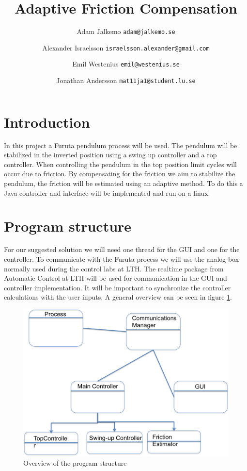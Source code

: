 \documentclass[10pt,a4paper]{article}
\author{Adam Jalkemo \texttt{adam@jalkemo.se} \and
Alexander Israelsson \texttt{israelsson.alexander@gmail.com} \and
Emil Westenius \texttt{emil@westenius.se} \and
Jonathan Andersson \texttt{mat11ja1@student.lu.se}}
\title{Adaptive Friction Compensation}
\begin{document}
\maketitle

\section{Introduction}
In this project a Furuta pendulum process will be used. The pendulum will be stabilized in the inverted position using a swing up controller and a top controller. When controlling the pendulum in the top position limit cycles will occur due to friction. By compensating for the friction we aim to stabilize the pendulum, the friction will be estimated using an adaptive method. To do this a Java controller and interface will be implemented and run on a linux.
\section{Program structure}
For our suggested solution we will need one thread for the GUI and one for the controller. To communicate with the Furuta process we will use the analog box normally used during the control labs at LTH. The realtime package from Automatic Control at LTH will be used for communication in the GUI and controller implementation. It will be important to synchronize the controller calculations with the user inputs. A general overview can be seen in figure \ref{fig:uml}.
\begin{figure}[H]
\centerline{\includegraphics[scale=0.7]{umlfuruta.png}}
\caption{Overview of the program structure}
\label{fig:uml}
\end{figure}
\end{document}
